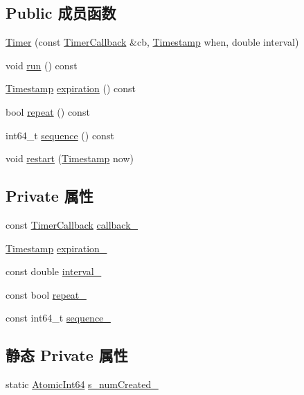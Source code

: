 \subsection*{Public 成员函数}
\begin{DoxyCompactItemize}
\item 
\hyperlink{classmuduo_1_1Timer_a302c3f4c56839e86ec39f308d167fcb9}{Timer} (const \hyperlink{namespacemuduo_a5f7453c2a15825e79bddf5deaec707bf}{Timer\+Callback} \&cb, \hyperlink{classmuduo_1_1Timestamp}{Timestamp} when, double interval)
\item 
void \hyperlink{classmuduo_1_1Timer_aa6b7bb009af6cd63f442559d3b8d1ab2}{run} () const
\item 
\hyperlink{classmuduo_1_1Timestamp}{Timestamp} \hyperlink{classmuduo_1_1Timer_afa0ac5aa813b96802d509cf972054108}{expiration} () const
\item 
bool \hyperlink{classmuduo_1_1Timer_a24898cae728c6bc6d1a3c3e6bdd977b2}{repeat} () const
\item 
int64\+\_\+t \hyperlink{classmuduo_1_1Timer_a99f306fa27f00a90b51f028787651b30}{sequence} () const
\item 
void \hyperlink{classmuduo_1_1Timer_af96f08cc8d7b3f18df9ce1a305d56ae9}{restart} (\hyperlink{classmuduo_1_1Timestamp}{Timestamp} now)
\end{DoxyCompactItemize}
\subsection*{Private 属性}
\begin{DoxyCompactItemize}
\item 
const \hyperlink{namespacemuduo_a5f7453c2a15825e79bddf5deaec707bf}{Timer\+Callback} \hyperlink{classmuduo_1_1Timer_ad0ec9bf1f19da5ffee08ad1832e0e3fa}{callback\+\_\+}
\item 
\hyperlink{classmuduo_1_1Timestamp}{Timestamp} \hyperlink{classmuduo_1_1Timer_ae09cd3f6f1b94265e9414fc517d41bd2}{expiration\+\_\+}
\item 
const double \hyperlink{classmuduo_1_1Timer_a9a47d57fe28bd4e5d35c713c98673caa}{interval\+\_\+}
\item 
const bool \hyperlink{classmuduo_1_1Timer_ad8f33a2a7d75058460b05e91e14bf3c9}{repeat\+\_\+}
\item 
const int64\+\_\+t \hyperlink{classmuduo_1_1Timer_a65bda86585a5579d40126ea80735008f}{sequence\+\_\+}
\end{DoxyCompactItemize}
\subsection*{静态 Private 属性}
\begin{DoxyCompactItemize}
\item 
static \hyperlink{namespacemuduo_aa79d31350742dfc80edb0d9a5df0e7e7}{Atomic\+Int64} \hyperlink{classmuduo_1_1Timer_ad38839cdf944546950365d3812d717b7}{s\+\_\+num\+Created\+\_\+}
\end{DoxyCompactItemize}


